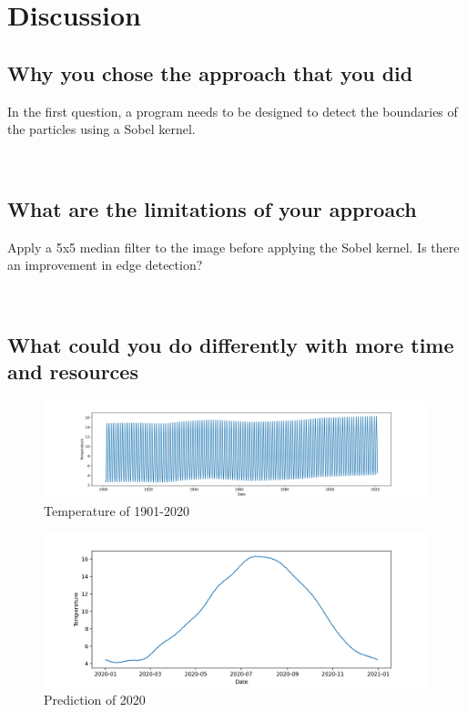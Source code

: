 \documentclass{article}
\begin{document}
\ 

\ 


\section{Discussion}

\subsection{Why you chose the approach that you did}

In the first question, a program needs to be designed to detect the boundaries of the particles using a Sobel kernel.





\ 


\subsection{What are the limitations of your approach}

Apply a 5x5 median filter to the image before applying the Sobel kernel. Is there an improvement in edge detection?




\ 



\subsection{What could you do differently with more time and resources}




\begin{figure}[h]
\centering
\includegraphics[width=16cm]{wholeyears.png} %
\caption{Temperature of 1901-2020} %
\end{figure}

\begin{figure}[h]
\centering
\includegraphics[width=16cm]{year2020.png} %
\caption{Prediction of 2020} %
\end{figure}
\end{document}
